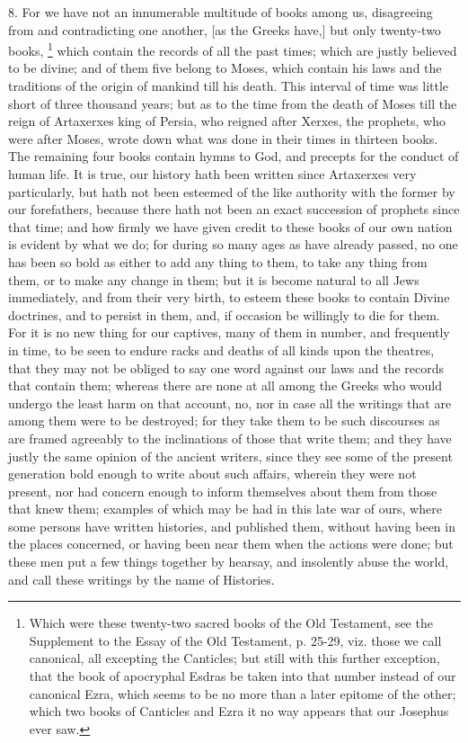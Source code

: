 8. For we have not an innumerable multitude of books among us, disagreeing
from and contradicting one another, [as the Greeks have,] but only
twenty-two books, \footnote{Which were these twenty-two
sacred books of the Old Testament, see the Supplement to the Essay of the
Old Testament, p. 25-29, viz. those we call canonical, all excepting the
Canticles; but still with this further exception, that the book of
apocryphal Esdras be taken into that number instead of our canonical Ezra,
which seems to be no more than a later epitome of the other; which two
books of Canticles and Ezra it no way appears that our Josephus ever saw.} which contain the records of all
the past times; which are justly believed to be divine; and of them five
belong to Moses, which contain his laws and the traditions of the origin
of mankind till his death. This interval of time was little short of three
thousand years; but as to the time from the death of Moses till the reign
of Artaxerxes king of Persia, who reigned after Xerxes, the prophets, who
were after Moses, wrote down what was done in their times in thirteen
books. The remaining four books contain hymns to God, and precepts for the
conduct of human life. It is true, our history hath been written since
Artaxerxes very particularly, but hath not been esteemed of the like
authority with the former by our forefathers, because there hath not been
an exact succession of prophets since that time; and how firmly we have
given credit to these books of our own nation is evident by what we do;
for during so many ages as have already passed, no one has been so bold as
either to add any thing to them, to take any thing from them, or to make
any change in them; but it is become natural to all Jews immediately, and
from their very birth, to esteem these books to contain Divine doctrines,
and to persist in them, and, if occasion be willingly to die for them. For
it is no new thing for our captives, many of them in number, and
frequently in time, to be seen to endure racks and deaths of all kinds
upon the theatres, that they may not be obliged to say one word against
our laws and the records that contain them; whereas there are none at all
among the Greeks who would undergo the least harm on that account, no, nor
in case all the writings that are among them were to be destroyed; for
they take them to be such discourses as are framed agreeably to the
inclinations of those that write them; and they have justly the same
opinion of the ancient writers, since they see some of the present
generation bold enough to write about such affairs, wherein they were not
present, nor had concern enough to inform themselves about them from those
that knew them; examples of which may be had in this late war of ours,
where some persons have written histories, and published them, without
having been in the places concerned, or having been near them when the
actions were done; but these men put a few things together by hearsay, and
insolently abuse the world, and call these writings by the name of
Histories.

